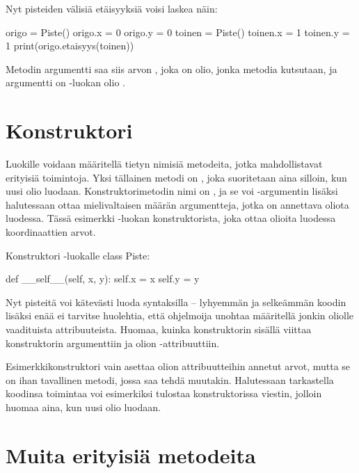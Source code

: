 Nyt pisteiden välisiä etäisyyksiä voisi laskea näin:

\begin{python}
origo = Piste()
origo.x = 0
origo.y = 0
toinen = Piste()
toinen.x = 1
toinen.y = 1
print(origo.etaisyys(toinen))
\end{python}

Metodin argumentti  saa siis arvon , joka on olio, jonka metodia kutsutaan, ja argumentti  on -luokan olio .

\section{Konstruktori}

Luokille voidaan määritellä tietyn nimisiä metodeita, jotka mahdollistavat erityisiä toimintoja. Yksi tällainen metodi on , joka suoritetaan aina silloin, kun uusi olio luodaan. Konstruktorimetodin nimi on , ja se voi -argumentin lisäksi halutessaan ottaa mielivaltaisen määrän argumentteja, jotka on annettava oliota luodessa. Tässä esimerkki -luokan konstruktorista, joka ottaa olioita luodessa koordinaattien arvot.

\begin{example}{Konstruktori -luokalle}
class Piste:

       def __self__(self, x, y):
              self.x = x
              self.y = y
\end{example}

Nyt pisteitä voi kätevästi luoda syntaksilla  -- lyhyemmän ja selkeämmän koodin lisäksi enää ei tarvitse huolehtia, että ohjelmoija unohtaa määritellä jonkin oliolle vaadituista attribuuteista. Huomaa, kuinka konstruktorin sisällä  viittaa konstruktorin argumenttiin  ja  olion -attribuuttiin.

Esimerkkikonstruktori vain asettaa olion attribuutteihin annetut arvot, mutta se on ihan tavallinen metodi, jossa saa tehdä muutakin. Halutessaan tarkastella koodinsa toimintaa voi esimerkiksi tulostaa konstruktorissa viestin, jolloin huomaa aina, kun uusi olio luodaan.

\section{Muita erityisiä metodeita}

